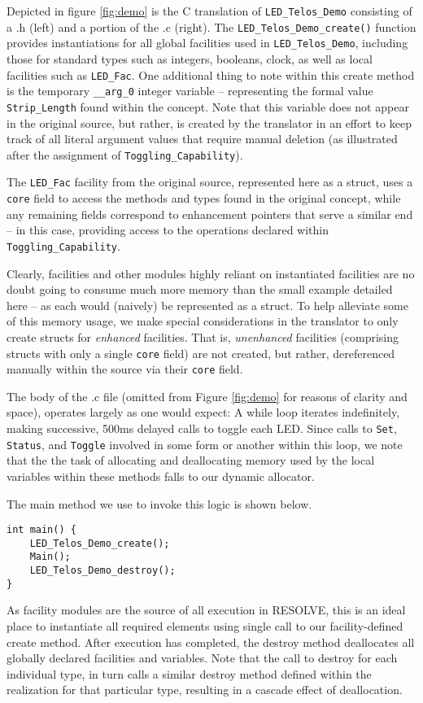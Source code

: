Depicted in figure \ref{fig:demo} is the C translation of \texttt{LED\_Telos\_Demo} consisting of a .h (left) and a portion of the .c (right). The \texttt{LED\_Telos\_Demo\_create()} function provides instantiations for all global facilities used in \texttt{LED\_Telos\_Demo}, including those for standard types such as integers, booleans, clock, as well as local facilities such as \texttt{LED\_Fac}. One additional thing to note within this create method is the temporary \texttt{\_\_arg\_0} integer variable -- representing the formal value \texttt{Strip\_Length} found within the concept. Note that this variable does not appear in the original source, but rather, is created by the translator in an effort to keep track of all literal argument values that require manual deletion (as illustrated after the assignment of \texttt{Toggling\_Capability}).

The \texttt{LED\_Fac} facility from the original source, represented here as a struct, uses a \texttt{core} field to access the methods and types found in the original concept, while any remaining fields correspond to enhancement pointers that serve a similar end -- in this case, providing access to the operations declared within  \texttt{Toggling\_Capability}.

Clearly, facilities and other modules highly reliant on instantiated facilities are no doubt going to consume much more memory than the small example detailed here -- as each would (naively) be represented as a struct. To help alleviate some of this memory usage, we make special considerations in the translator to only create structs for \textit{enhanced} facilities. That is, \textit{unenhanced} facilities (comprising structs with only a single \texttt{core} field) are not created, but rather, dereferenced manually within the source via their \texttt{core} field.

The body of the .c file (omitted from Figure \ref{fig:demo} for reasons of clarity and space), operates largely as one would expect: A while loop iterates indefinitely, making successive, 500ms delayed calls to toggle each LED. Since calls to \texttt{Set}, \texttt{Status}, and \texttt{Toggle} involved in some form or another within this loop, we note that the the task of allocating and deallocating memory used by the local variables within these methods falls to our dynamic allocator.

The main method we use to invoke this logic is shown below. 

\begin{verbatim}
int main() {
    LED_Telos_Demo_create();
    Main();
    LED_Telos_Demo_destroy();
}
\end{verbatim}As facility modules are the source of all execution in RESOLVE, this is an ideal place to instantiate all required elements using single call to our facility-defined create method. After execution has completed, the destroy method deallocates all globally declared facilities and variables. Note that the call to destroy for each individual type, in turn calls a similar destroy method defined within the realization for that particular type, resulting in a cascade effect of deallocation.

